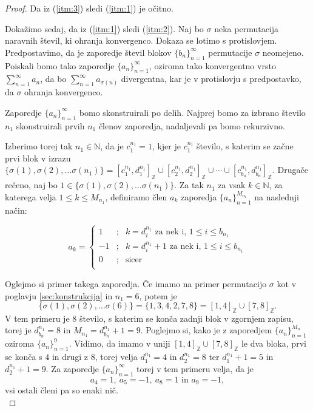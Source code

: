 \documentclass[12pt,a4paper,reqno]{amsart}
\theoremstyle{definition} %
\theoremstyle{plain} %
\newcommand{\N}{\mathbb N}
\newcommand{\Z}{\mathbb Z}
\begin{document}
\begin{proof}
Da iz (\ref{itm:3}) sledi (\ref{itm:1}) je očitno.

Dokažimo sedaj, da iz (\ref{itm:1}) sledi (\ref{itm:2}).
Naj bo $\sigma$ neka permutacija naravnih števil, ki ohranja konvergenco. Dokaza se lotimo s protislovjem. Predpostavimo, da je zaporedje števil blokov $\{b_n\}^{\infty}_{n=1}$ permutacije $\sigma$ neomejeno. Poiskali bomo tako zaporedje $\{a_n\}_{n=1}^{\infty}$, oziroma tako konvergentno vrsto $\sum^{\infty}_{n=1}a_n$, da bo $\sum^{\infty}_{n=1}a_{\sigma (n)}$ divergentna, kar je v protislovju s predpostavko, da $\sigma$ ohranja konvergenco. 

Zaporedje $\{a_n\}_{n=1}^{\infty}$ bomo skonstruirali po delih. Najprej bomo za izbrano število $n_1$ skonstruirali prvih $n_1$ členov zaporedja, nadaljevali pa bomo rekurzivno.

Izberimo torej tak $n_1\in \N$, da je $c_1^{n_1}=1$, kjer je  $c_1^{n_1}$ število, s katerim se začne prvi blok v izrazu $\{ \sigma (1), \sigma (2), \ldots \sigma (n_1) \} = [c^{n_1}_1, d^{n_1}_1]_{\Z} \cup [c^{n_1}_2, d^{n_1}_2]_{\Z} \cup \cdots \cup [c^{n_1}_{b_n}, d^{n_1}_{b_n}]_{\Z}$. Drugače rečeno, naj bo $1\in \{ \sigma (1), \sigma (2), \ldots \sigma (n_1) \}$. Za tak $n_1$ za vsak $k\in \N$, za katerega velja $1 \leq k \leq M_{n_1}$, definiramo člen $a_k$ zaporedja $\{a_n\}^{M_{n_1}}_{n=1}$ na naslednji način:

$$a_k = 
\left\{ 
\begin{array}{ccc}
1&;&k=d_i^{n_1}\textrm{ za nek i, }1\leq i \leq b_{n_1}\\
-1&;&k=d_i^{n_1}+1\textrm{ za nek i, }1\leq i \leq b_{n_1}\\
0&;&\textrm{sicer}\\
\end{array}
\right. 
$$

Oglejmo si primer takega zaporedja. Če imamo na primer permutacijo $\sigma$ kot v poglavju \ref{sec:konstrukcija} in $n_1=6$, potem je $$\{ \sigma (1), \sigma (2), \ldots \sigma (6) \} = \{1, 3, 4, 2, 7, 8 \}= [1,4]_{\Z} \cup [7,8]_{\Z}.$$ 
V tem primeru je $8$ število, s katerim se konča zadnji blok v zgornjem zapisu, torej je $d_{b_n}^{n_1}=8$ in $M_{n_1}=d_{b_n}^{n_1}+1=9$. Poglejmo si, kako je z zaporedjem $\{a_n\}_{n=1}^{M_n}$ oziroma $\{a_n\}_{n=1}^9$.
Vidimo, da imamo v uniji $[1,4]_{\Z} \cup [7,8]_{\Z}$ le dva bloka, prvi se konča s $4$ in drugi z $8$, torej velja $d_1^{n_1}=4$ in $d_2^{n_1}=8$ ter $d_1^{n_1}+1=5$ in $d_2^{n_1}+1=9$. Za zaporedje $\{a_n\}_{n=1}^{\infty}$ torej v tem primeru velja, da je $$a_4=1,\ a_5=-1,\ a_8 =1\textrm{ in }a_9=-1,$$ vsi ostali členi pa so enaki nič.\\


\end{proof}
\end{document}
